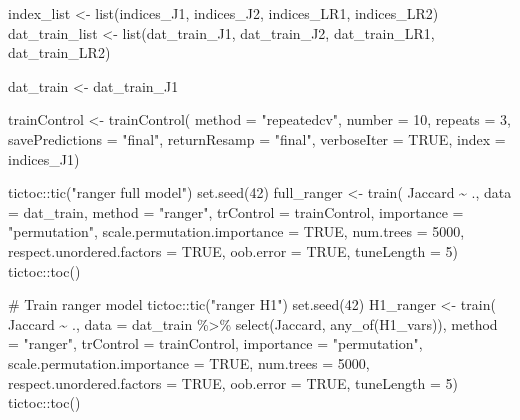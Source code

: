 \documentclass[
  letterpaper,
  DIV=11,
  numbers=noendperiod]{scrreprt}
\newenvironment{Shaded}{\begin{snugshade}}{\end{snugshade}}
\newcommand{\AttributeTok}[1]{\textcolor[rgb]{0.40,0.45,0.13}{#1}}
\newcommand{\CommentTok}[1]{\textcolor[rgb]{0.37,0.37,0.37}{#1}}
\newcommand{\ConstantTok}[1]{\textcolor[rgb]{0.56,0.35,0.01}{#1}}
\newcommand{\DecValTok}[1]{\textcolor[rgb]{0.68,0.00,0.00}{#1}}
\newcommand{\FunctionTok}[1]{\textcolor[rgb]{0.28,0.35,0.67}{#1}}
\newcommand{\NormalTok}[1]{\textcolor[rgb]{0.00,0.23,0.31}{#1}}
\newcommand{\OtherTok}[1]{\textcolor[rgb]{0.00,0.23,0.31}{#1}}
\newcommand{\SpecialCharTok}[1]{\textcolor[rgb]{0.37,0.37,0.37}{#1}}
\newcommand{\StringTok}[1]{\textcolor[rgb]{0.13,0.47,0.30}{#1}}
\begin{document}
\begin{Shaded}
\begin{Highlighting}[]
\NormalTok{index\_list }\OtherTok{\textless{}{-}} \FunctionTok{list}\NormalTok{(indices\_J1, indices\_J2, indices\_LR1, indices\_LR2)}
\NormalTok{dat\_train\_list }\OtherTok{\textless{}{-}} \FunctionTok{list}\NormalTok{(dat\_train\_J1, dat\_train\_J2, dat\_train\_LR1, dat\_train\_LR2)}

\NormalTok{dat\_train }\OtherTok{\textless{}{-}}\NormalTok{ dat\_train\_J1}

\NormalTok{trainControl }\OtherTok{\textless{}{-}} \FunctionTok{trainControl}\NormalTok{(}
    \AttributeTok{method =} \StringTok{"repeatedcv"}\NormalTok{,}
    \AttributeTok{number =} \DecValTok{10}\NormalTok{,}
    \AttributeTok{repeats =} \DecValTok{3}\NormalTok{,}
    \AttributeTok{savePredictions =} \StringTok{"final"}\NormalTok{,}
    \AttributeTok{returnResamp =} \StringTok{"final"}\NormalTok{,}
    \AttributeTok{verboseIter =} \ConstantTok{TRUE}\NormalTok{,}
    \AttributeTok{index =}\NormalTok{ indices\_J1)}

\NormalTok{tictoc}\SpecialCharTok{::}\FunctionTok{tic}\NormalTok{(}\StringTok{"ranger full model"}\NormalTok{)}
\FunctionTok{set.seed}\NormalTok{(}\DecValTok{42}\NormalTok{)}
\NormalTok{full\_ranger }\OtherTok{\textless{}{-}} \FunctionTok{train}\NormalTok{(}
\NormalTok{    Jaccard }\SpecialCharTok{\textasciitilde{}}\NormalTok{ .,}
    \AttributeTok{data =}\NormalTok{ dat\_train,}
    \AttributeTok{method =} \StringTok{"ranger"}\NormalTok{,}
    \AttributeTok{trControl =}\NormalTok{ trainControl,}
    \AttributeTok{importance =} \StringTok{"permutation"}\NormalTok{,}
    \AttributeTok{scale.permutation.importance =} \ConstantTok{TRUE}\NormalTok{,}
    \AttributeTok{num.trees =} \DecValTok{5000}\NormalTok{,}
    \AttributeTok{respect.unordered.factors =} \ConstantTok{TRUE}\NormalTok{,}
    \AttributeTok{oob.error =} \ConstantTok{TRUE}\NormalTok{,}
    \AttributeTok{tuneLength =} \DecValTok{5}\NormalTok{)}
\NormalTok{tictoc}\SpecialCharTok{::}\FunctionTok{toc}\NormalTok{()}


\CommentTok{\# Train ranger model}
\NormalTok{tictoc}\SpecialCharTok{::}\FunctionTok{tic}\NormalTok{(}\StringTok{"ranger H1"}\NormalTok{)}
\FunctionTok{set.seed}\NormalTok{(}\DecValTok{42}\NormalTok{)}
\NormalTok{H1\_ranger }\OtherTok{\textless{}{-}} \FunctionTok{train}\NormalTok{(}
\NormalTok{    Jaccard }\SpecialCharTok{\textasciitilde{}}\NormalTok{ .,}
    \AttributeTok{data =}\NormalTok{ dat\_train }\SpecialCharTok{\%\textgreater{}\%} \FunctionTok{select}\NormalTok{(Jaccard, }\FunctionTok{any\_of}\NormalTok{(H1\_vars)),}
    \AttributeTok{method =} \StringTok{"ranger"}\NormalTok{,}
    \AttributeTok{trControl =}\NormalTok{ trainControl,}
    \AttributeTok{importance =} \StringTok{"permutation"}\NormalTok{,}
    \AttributeTok{scale.permutation.importance =} \ConstantTok{TRUE}\NormalTok{,}
    \AttributeTok{num.trees =} \DecValTok{5000}\NormalTok{,}
    \AttributeTok{respect.unordered.factors =} \ConstantTok{TRUE}\NormalTok{,}
    \AttributeTok{oob.error =} \ConstantTok{TRUE}\NormalTok{,}
    \AttributeTok{tuneLength =} \DecValTok{5}\NormalTok{)}
\NormalTok{tictoc}\SpecialCharTok{::}\FunctionTok{toc}\NormalTok{()}



\end{Highlighting}
\end{Shaded}
\end{document}
